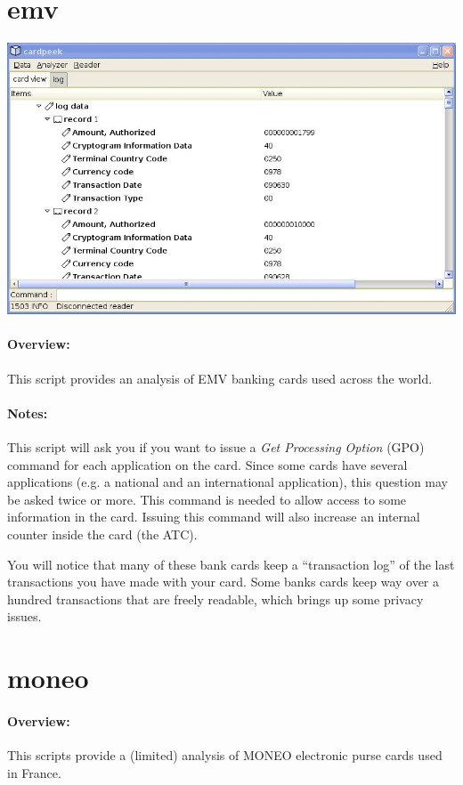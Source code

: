 \documentclass[11pt]{report}
\begin{document}
\section{emv}

\begin{center}
\includegraphics[width=.75\textwidth]{graphics/sample-emv.jpg}
\end{center}

\paragraph{Overview:}
This script provides an analysis of EMV banking cards used across the world.

\paragraph{Notes:}
This script will ask you if you want to issue a \emph{Get Processing Option} (GPO) command for each application on the card.
Since some cards have several applications (e.g. a national and an international application), this question may be asked twice or more.
This command is needed to allow access to some information in the card.
Issuing this command will also increase an internal counter inside the card (the ATC). 

You will notice that many of these bank cards keep a ``transaction log'' of the last transactions you have made with your card.
Some banks cards keep way over a hundred transactions that are freely readable, which brings up some privacy issues.

\section{moneo}

\paragraph{Overview:}
This scripts provide a (limited) analysis of MONEO electronic purse cards used in France.
\end{document}
